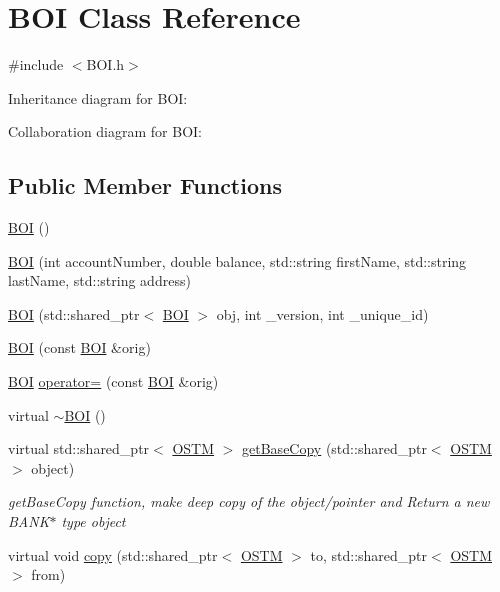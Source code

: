 \hypertarget{class_b_o_i}{}\section{B\+OI Class Reference}
\label{class_b_o_i}


{\ttfamily \#include $<$B\+O\+I.\+h$>$}



Inheritance diagram for B\+OI\+:


Collaboration diagram for B\+OI\+:
\subsection*{Public Member Functions}
\begin{DoxyCompactItemize}
\item 
\hyperlink{class_b_o_i_a6af682a5f199a029681f0cb2b8658706}{B\+OI} ()
\item 
\hyperlink{class_b_o_i_a1807bd07cad08109c974edbb2c32591c}{B\+OI} (int account\+Number, double balance, std\+::string first\+Name, std\+::string last\+Name, std\+::string address)
\item 
\hyperlink{class_b_o_i_ae4263940f8ffdd40d5f01a714b20f791}{B\+OI} (std\+::shared\+\_\+ptr$<$ \hyperlink{class_b_o_i}{B\+OI} $>$ obj, int \+\_\+version, int \+\_\+unique\+\_\+id)
\item 
\hyperlink{class_b_o_i_a7757de8d3ac656871bed4b07d77457ff}{B\+OI} (const \hyperlink{class_b_o_i}{B\+OI} \&orig)
\item 
\hyperlink{class_b_o_i}{B\+OI} \hyperlink{class_b_o_i_a4b4a3976cc13c4d3de0d7ff8882a7af3}{operator=} (const \hyperlink{class_b_o_i}{B\+OI} \&orig)
\item 
virtual \hyperlink{class_b_o_i_a617f46a599129178c6b11b4846759a6c}{$\sim$\+B\+OI} ()
\item 
virtual std\+::shared\+\_\+ptr$<$ \hyperlink{class_o_s_t_m}{O\+S\+TM} $>$ \hyperlink{class_b_o_i_ad53ae2918a656793b9d7a670d35ecfa3}{get\+Base\+Copy} (std\+::shared\+\_\+ptr$<$ \hyperlink{class_o_s_t_m}{O\+S\+TM} $>$ object)
\begin{DoxyCompactList}\small\item\em get\+Base\+Copy function, make deep copy of the object/pointer and Return a new B\+A\+N\+K$\ast$ type object \end{DoxyCompactList}\item 
virtual void \hyperlink{class_b_o_i_a9ff2d32c25c23a1bea6316f50c3bf677}{copy} (std\+::shared\+\_\+ptr$<$ \hyperlink{class_o_s_t_m}{O\+S\+TM} $>$ to, std\+::shared\+\_\+ptr$<$ \hyperlink{class_o_s_t_m}{O\+S\+TM} $>$ from)

\end{DoxyCompactItemize}
